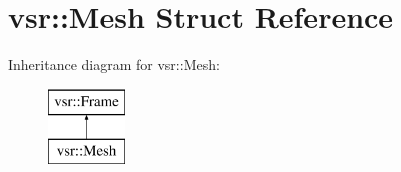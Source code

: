 \hypertarget{structvsr_1_1_mesh}{\section{vsr\-:\-:Mesh Struct Reference}
\label{structvsr_1_1_mesh}
}
Inheritance diagram for vsr\-:\-:Mesh\-:\begin{figure}[H]
\begin{center}
\leavevmode
\includegraphics[height=2.000000cm]{structvsr_1_1_mesh}
\end{center}
\end{figure}

